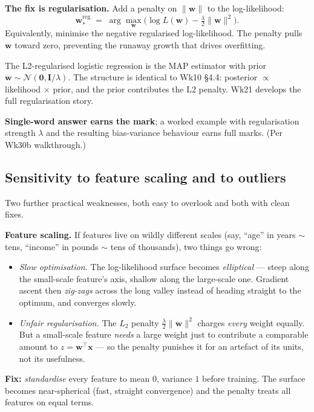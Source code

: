 \documentclass[11pt, a4paper]{article}
\begin{document}
\textbf{The fix is regularisation.} Add a penalty on $\|\mathbf{w}\|$ to the log-likelihood:
\[
\mathbf{w}_*^{\text{reg}} \;=\; \arg\max_\mathbf{w}\big(\log L(\mathbf{w}) - \tfrac{\lambda}{2}\|\mathbf{w}\|^2\big).
\]
Equivalently, minimise the negative regularised log-likelihood. The penalty pulls $\mathbf{w}$ toward zero, preventing the runaway growth that drives overfitting.

\begin{notebox}
The L2-regularised logistic regression is the MAP estimator with prior $\mathbf{w}\sim\mathcal{N}(\mathbf{0},\mathbf{I}/\lambda)$. The structure is identical to Wk10 §4.4: posterior $\propto$ likelihood $\times$ prior, and the prior contributes the L2 penalty. Wk21 develops the full regularisation story.
\end{notebox}

\textbf{Single-word answer earns the mark}; a worked example with regularisation strength $\lambda$ and the resulting bias-variance behaviour earns full marks. (Per Wk30b walkthrough.)

\subsection{Sensitivity to feature scaling and to outliers}

Two further practical weaknesses, both easy to overlook and both with clean fixes.

\textbf{Feature scaling.} If features live on wildly different scales (say, ``age'' in years $\sim$ tens, ``income'' in pounds $\sim$ tens of thousands), two things go wrong:
\begin{itemize}
  \item \emph{Slow optimisation.} The log-likelihood surface becomes \emph{elliptical} --- steep along the small-scale feature's axis, shallow along the large-scale one. Gradient ascent then \emph{zig-zags} across the long valley instead of heading straight to the optimum, and converges slowly.
  \item \emph{Unfair regularisation.} The $L_2$ penalty $\tfrac{\lambda}{2}\|\mathbf{w}\|^2$ charges \emph{every} weight equally. But a small-scale feature \emph{needs} a large weight just to contribute a comparable amount to $z = \mathbf{w}^\top\mathbf{x}$ --- so the penalty punishes it for an artefact of its units, not its usefulness.
\end{itemize}
\textbf{Fix:} \emph{standardise} every feature to mean $0$, variance $1$ before training. The surface becomes near-spherical (fast, straight convergence) and the penalty treats all features on equal terms.
\end{document}
